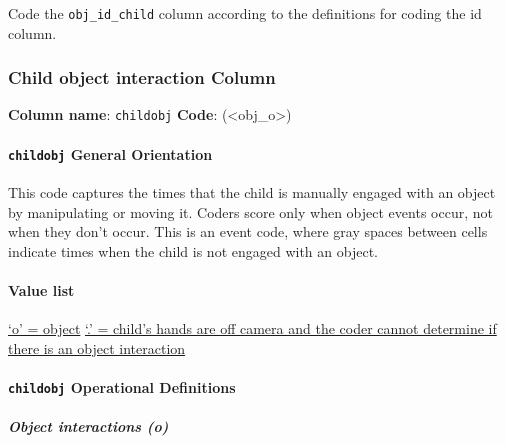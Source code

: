 \documentclass[
]{book}
\begin{document}
Code the \texttt{obj\_id\_child} column according to the definitions for coding the id column.

\hypertarget{child-object-interaction-column}{%
\subsubsection*{Child object interaction Column}\label{child-object-interaction-column}}

\textbf{Column name}: \texttt{childobj}
\textbf{Code}: (\textless obj\_o\textgreater)

\hypertarget{childobj-general-orientation}{%
\paragraph{\texorpdfstring{\texttt{childobj} General Orientation}{childobj General Orientation}}\label{childobj-general-orientation}}

This code captures the times that the child is manually engaged with an object by manipulating or moving it. Coders score only when object events occur, not when they don't occur. This is an event code, where gray spaces between cells indicate times when the child is not engaged with an object.

\hypertarget{value-list}{%
\paragraph*{Value list}\label{value-list}}

\protect\hyperlink{child_object}{`o' = object}
\protect\hyperlink{child_hands_off_camera}{`.' = child's hands are off camera and the coder cannot determine if there is an object interaction}

\hypertarget{childobj-operational-definitions}{%
\paragraph*{\texorpdfstring{\texttt{childobj} Operational Definitions}{childobj Operational Definitions}}\label{childobj-operational-definitions}}

\hypertarget{child_object}{%
\subparagraph*{Object interactions (o)}\label{child_object}}
\end{document}
